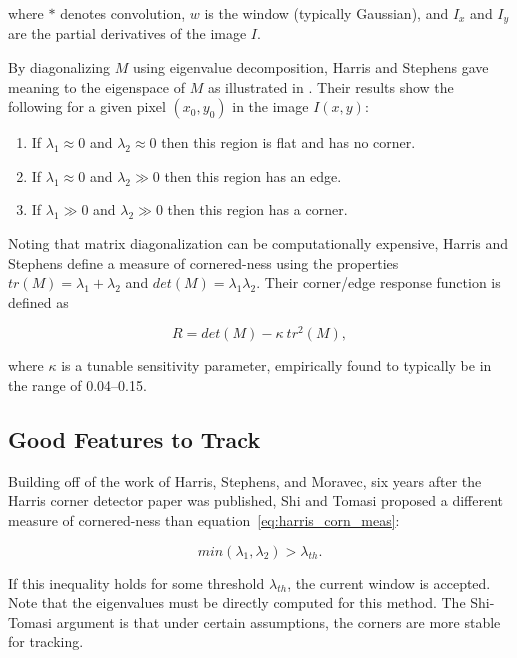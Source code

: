 \documentclass[hidelinks]{article}
\begin{document}
where $*$ denotes convolution, $w$ is the window (typically Gaussian), and $I_x$ and $I_y$ are the partial derivatives of the image $I$.

By diagonalizing $M$ using eigenvalue decomposition, Harris and Stephens gave meaning to the eigenspace of $M$ as illustrated in \cite[Figure~5]{Harris1988}. Their results show the following for a given pixel $(x_0, y_0)$ in the image $I(x, y)$:

\begin{enumerate}
  \item If $\lambda_1 \approx 0$ and $\lambda_2 \approx 0$ then this region is flat and has no corner.
  \item If $\lambda_1 \approx 0$ and $\lambda_2 \gg 0$ then this region has an edge.
  \item If $\lambda_1 \gg 0$ and $\lambda_2 \gg 0$ then this region has a corner.
\end{enumerate}

Noting that matrix diagonalization can be computationally expensive, Harris and Stephens define a measure of cornered-ness using the properties $tr(M) = \lambda_1 + \lambda_2$ and $det(M) = \lambda_1 \lambda_2$. Their corner/edge response function is defined as

\begin{equation}\label{eq:harris_corn_meas}
  R = det(M) - \kappa\ tr^2(M),
\end{equation}

where $\kappa$ is a tunable sensitivity parameter, empirically found to typically be in the range of \numrange{0.04}{0.15}.

\subsection{Good Features to Track}
Building off of the work of Harris, Stephens, and Moravec, six years after the Harris corner detector paper was published, Shi and Tomasi proposed a different measure of cornered-ness than equation~\ref{eq:harris_corn_meas}:

\begin{equation}
  min(\lambda_1, \lambda_2) > \lambda_{th}.
\end{equation}

If this inequality holds for some threshold $\lambda_{th}$, the current window is accepted. Note that the eigenvalues must be directly computed for this method. The Shi-Tomasi argument is that under certain assumptions, the corners are more stable for tracking.
\end{document}

